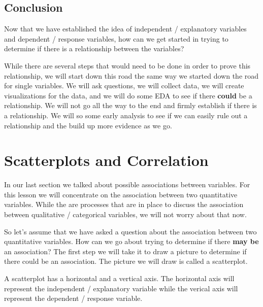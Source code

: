 \documentclass[
  letterpaper,
  DIV=11,
  numbers=noendperiod]{scrreprt}
\begin{document}
\section*{Conclusion}\label{conclusion-4}


Now that we have established the idea of independent / explanatory
variables and dependent / response variables, how can we get started in
trying to determine if there is a relationship between the variables?

While there are several steps that would need to be done in order to
prove this relationship, we will start down this road the same way we
started down the road for single variables. We will ask questions, we
will collect data, we will create visualizations for the data, and we
will do some EDA to see if there \textbf{could} be a relationship. We
will not go all the way to the end and firmly establish if there is a
relationship. We will so some early analysis to see if we can easily
rule out a relationship and the build up more evidence as we go.


\chapter*{Scatterplots and
Correlation}\label{scatterplots-and-correlation}


In our last section we talked about possible associations between
variables. For this lesson we will concentrate on the association
between two quantitative variables. While the are processes that are in
place to discuss the association between qualitative / categorical
variables, we will not worry about that now.

So let's assume that we have asked a question about the association
between two quantitative variables. How can we go about trying to
determine if there \textbf{may be} an association? The first step we
will take it to draw a picture to determine if there could be an
association. The picture we will draw is called a scatterplot.

A scatterplot has a horizontal and a vertical axis. The horizontal axis
will represent the independent / explanatory variable while the verical
axis will represent the dependent / response variable.
\end{document}
